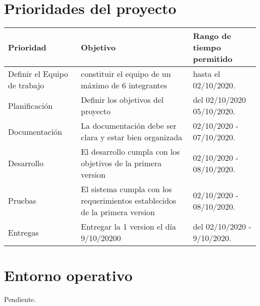 \documentclass[12pt,a4paper]{book}
\begin{document}
\section{Prioridades del proyecto}
\vspace{0.5 cm}
\begin{table}[h!]
\begin{tabular}{|p{5 cm}|p{5 cm}|p{5 cm}|}
\hline
\textbf{Prioridad}&\textbf{Objetivo}&\textbf{Rango de tiempo permitido}
\\\hline
Definir el Equipo de trabajo&constituir el equipo de un máximo de 6 integrantes& hasta el 02/10/2020.\\\hline
Planificación&Definir los objetivos del proyecto & del 02/10/2020 05/10/2020.\\\hline
Documentación&La documentación debe ser clara y estar bien organizada& 02/10/2020 - 07/10/2020.\\\hline
Desarrollo&El desarrollo cumpla con los objetivos de la primera version& 02/10/2020 - 08/10/2020.\\\hline
Pruebas&El sistema cumpla con los requerimientos establecidos de la primera version& 02/10/2020 - 08/10/2020.\\\hline
Entregas&Entregar la 1 version el día 9/10/20200 & del 02/10/2020 - 9/10/2020.\\\hline
\end{tabular}
\end{table}

\section{Entorno operativo}
\vspace{0.5 cm}
Pendiente.

  
\end{document}
